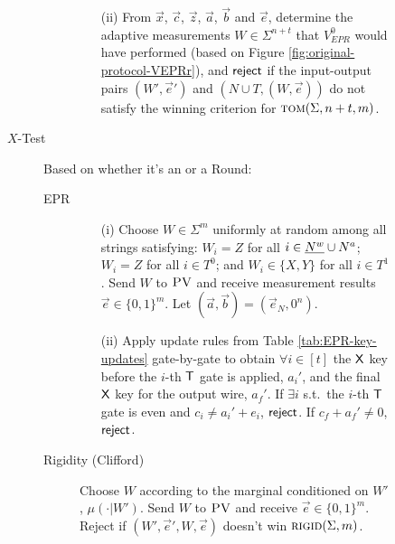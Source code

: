 \documentclass[11pt]{article}
\theoremstyle{remark}
\theoremstyle{definition}
\newcommand{\rigid}{\textsc{rigid}}
\newcommand{\tom}{\textsc{tom}}
\newcommand{\pv}{\textsc{PV}}
\newcommand{\highlight}[1]{\uline{#1}}
\begin{document}
\begin{figure}[H]
\begin{description}
\begin{description}
\begin{enumerate}
		\item[(ii)]
		From $\vec{x}$, $\vec{c}$, $\vec{z}$, $\vec{a}$, $\vec{b}$ and $\vec{e}$, determine the adaptive measurements $W\in\Sigma^{n+t}$ that $V_{EPR}^0$ would have performed (based on Figure \ref{fig:original-protocol-VEPRr}), and $\sf reject$ if the input-output pairs $(W',\vec{e}')$ and $(N\cup T,(W,\vec{e}))$ do not satisfy the winning criterion for $\tom(\Sigma,n+t,m)$.
		\end{enumerate}
	\end{description}
\item[$X$-Test] Based on whether it's an  or a  Round:
\begin{description}
	\item[EPR] 
	\begin{enumerate}
		\item[(i)] Choose $W\in\Sigma^m$ uniformly at random among all strings
      satisfying: $W_i=Z$ for all $i\in \highlight{N^w} \cup N^a$; $W_i=Z$ for all $i\in T^0$; and $W_i\in\{X,Y\}$ for all $i\in T^1$. Send $W$ to $\pv$ and receive measurement results $\vec{e}\in\{0,1\}^m$. Let $(\vec{a},\vec{b})=(\vec{e}_N,0^n)$. 
		\item[(ii)] Apply update rules from Table \ref{tab:EPR-key-updates} gate-by-gate to obtain $\forall i\in [t]$ the $\sf X$ key before the $i$-th $\sf T$ gate is applied, $a_i'$, and the final $\sf X$ key for the output wire, $a_f'$. 
If $\exists i$ s.t.\ the $i$-th $\sf T$ gate is even and $c_i\neq a_i'+e_i$, $\sf reject$. If $c_f+a_f'\neq 0$, $\sf reject$. 
	\end{enumerate}
	\item[Rigidity (Clifford)] Choose ${W}$ according to the marginal conditioned on ${W}'$, $\mu(\cdot|{W}')$. 
	Send ${W}$ to $\pv$ and receive $\vec{e}\in\{0,1\}^m$. Reject if   $({W}',\vec{e}',{W},\vec{e})$ doesn't win $\rigid(\Sigma,m)$. 
\end{description}


\end{description}
\end{figure}
\end{document}
